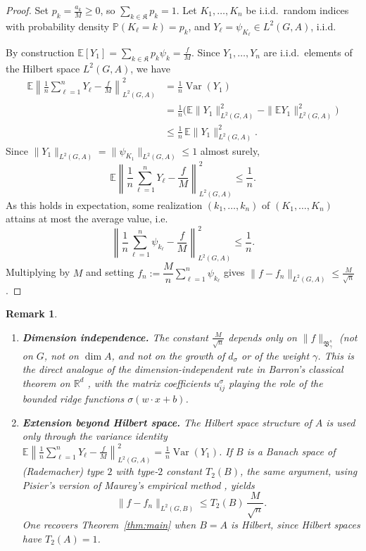 \documentclass[12pt]{amsart}%
\newtheorem{remark}[theorem]{Remark}
\def\Var{\mathop{Var}}
\begin{document}
\begin{proof}
Set $p_k = \frac{a_k}{M} \ge 0$, so $\sum\limits_{k\in\mathfrak{K}} p_k = 1$.
Let $K_1,\dots,K_n$ be i.i.d.\ random indices with probability density $\mathbb{P}(K_\ell=k)=p_k$,
and  $Y_\ell = \psi_{K_\ell} \in L^2(G,A)$, i.i.d.
 
By construction $\mathbb{E}[Y_1] = \sum\limits_{k\in\mathfrak{K}} p_k \psi_k = \frac{f}{M}$. Since
$Y_1,\dots,Y_n$ are i.i.d.\ elements of the Hilbert space $L^2(G,A)$, we have
\begin{align*}
\mathbb{E}\left\| \frac{1}{n}\sum_{\ell=1}^n Y_\ell - \frac{f}{M} \right\|_{L^2(G,A)}^2
&= \frac1n \Var(Y_1)\\
&= \frac1n \Big( \mathbb{E}\|Y_1\|_{L^2(G,A)}^2 - \|\mathbb{E} Y_1\|_{L^2(G,A)}^2 \Big)\\
&\le \frac1n\, \mathbb{E}\|Y_1\|_{L^2(G,A)}^2.
\end{align*}
Since $\|Y_1\|_{L^2(G,A)} = \|\psi_{K_1}\|_{L^2(G,A)} \le 1$ almost surely,
\[
\mathbb{E}\left\| \frac1n\sum_{\ell=1}^n Y_\ell - \frac{f}{M} \right\|_{L^2(G,A)}^2 \le \frac1n .
\]
As this holds in expectation, some realization $(k_1,\dots,k_n)$ of
$(K_1,\dots,K_n)$ attains at most the average value, i.e.
\[
\left\| \frac1n \sum_{\ell=1}^n \psi_{k_\ell} - \frac{f}{M} \right\|_{L^2(G,A)}^2
\le \frac1n .
\]
Multiplying by $M$ and setting $f_n := \dfrac{M}{n}\sum_{\ell=1}^n \psi_{k_\ell}$
gives $\|f-f_n\|_{L^2(G,A)} \le\frac{M}{\sqrt {n}}$. 
\end{proof}
 \begin{remark}{\rm
 \begin{enumerate}
\item[(i)] {\bf Dimension independence.}
The constant $\frac{M}{\sqrt {n}}$ depends only on $\|f\|_{\mathfrak{B}^s_\gamma}$ (not on $G$,
not on $\dim A$, and not on the growth of $d_\sigma$ or of the weight
$\gamma$. This is the direct analogue of the dimension-independent rate in
Barron's classical theorem on $\mathbb{R}^d$ \cite{Barron1993}, with the matrix coefficients
$u^\sigma_{ij}$ playing the role of the bounded ridge functions
$\sigma(w\cdot x + b)$.
\item[(ii)] {\bf Extension beyond Hilbert space.}
The Hilbert space structure of $A$ is used only through the variance
identity $\mathbb{E}\left\|\frac{1}{n}\sum_{\ell=1}^n Y_\ell - \frac{f}{M} \right\|_{L^2(G,A)}^2
= \frac{1}{n} \Var(Y_1)$. If $B$ is a
Banach space of (Rademacher) type $2$ with type-$2$ constant $T_2(B)$, the
same argument, using Pisier's version of Maurey's empirical method \cite{Pisier1989},  yields
$$
\|f - f_n\|_{L^2(G,B)} \le T_2(B)\, \frac{M}{\sqrt n}.
$$
One recovers Theorem~\ref{thm:main} when $B=A$ is Hilbert, since Hilbert
spaces have $T_2(A)=1$.
\end{enumerate}
}\end{remark}
\end{document}
